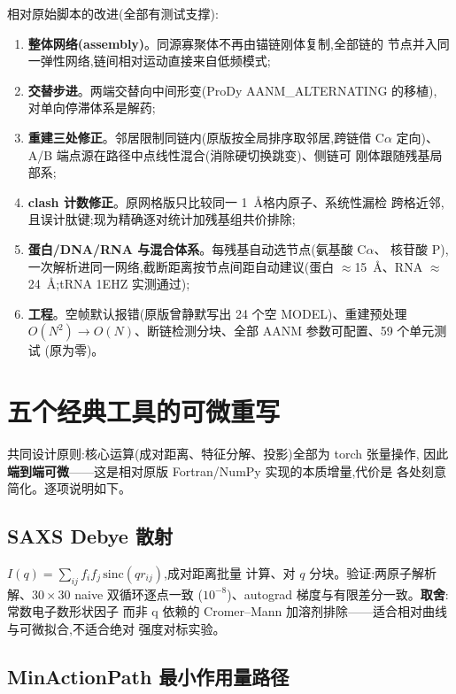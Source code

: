 \documentclass[11pt]{article}
\begin{document}
相对原始脚本的改进(全部有测试支撑):

\begin{enumerate}[itemsep=1.5pt,topsep=2pt]
\item \textbf{整体网络(assembly)}。同源寡聚体不再由锚链刚体复制,全部链的
节点并入同一弹性网络,链间相对运动直接来自低频模式;
\item \textbf{交替步进}。两端交替向中间形变(ProDy AANM\_ALTERNATING 的移植),
对单向停滞体系是解药;
\item \textbf{重建三处修正}。邻居限制同链内(原版按全局排序取邻居,跨链借
C$\alpha$ 定向)、A/B 端点源在路径中点线性混合(消除硬切换跳变)、侧链可
刚体跟随残基局部系;
\item \textbf{clash 计数修正}。原网格版只比较同一 1~\AA 格内原子、系统性漏检
跨格近邻,且误计肽键;现为精确逐对统计加残基组共价排除;
\item \textbf{蛋白/DNA/RNA 与混合体系}。每残基自动选节点(氨基酸 C$\alpha$、
核苷酸 P),一次解析进同一网络,截断距离按节点间距自动建议(蛋白
$\approx$15~\AA、RNA $\approx$24~\AA;tRNA 1EHZ 实测通过);
\item \textbf{工程}。空帧默认报错(原版曾静默写出 24 个空 MODEL)、重建预处理
$O(N^2)\to O(N)$、断链检测分块、全部 AANM 参数可配置、59 个单元测试
(原为零)。
\end{enumerate}

\section{五个经典工具的可微重写}
\label{sec:classic}

共同设计原则:核心运算(成对距离、特征分解、投影)全部为 torch 张量操作,
因此\textbf{端到端可微}——这是相对原版 Fortran/NumPy 实现的本质增量,代价是
各处刻意简化。逐项说明如下。

\subsection{SAXS Debye 散射}

$I(q)=\sum_{ij}f_if_j\,\mathrm{sinc}(qr_{ij})$\cite{debye1915},成对距离批量
计算、对 $q$ 分块。验证:两原子解析解、$30\times30$ naive 双循环逐点一致
($10^{-8}$)、autograd 梯度与有限差分一致。\textbf{取舍}:常数电子数形状因子
而非 q 依赖的 Cromer--Mann 加溶剂排除——适合相对曲线与可微拟合,不适合绝对
强度对标实验。

\subsection{MinActionPath 最小作用量路径}
\end{document}
